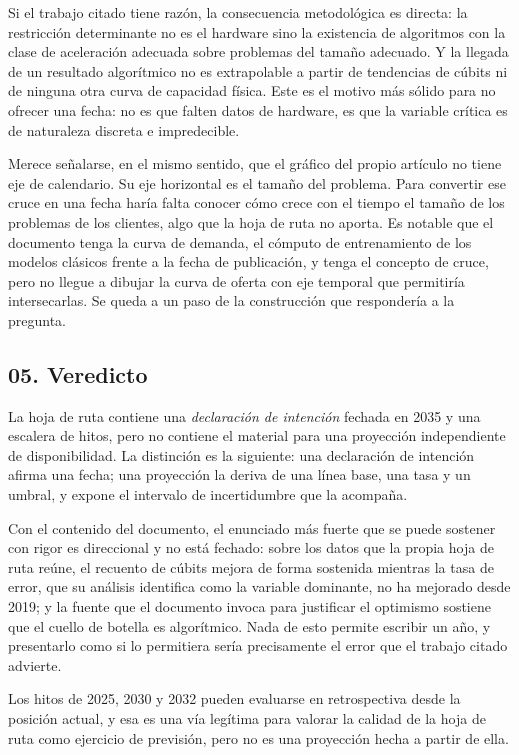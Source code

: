 \documentclass[11pt,letterpaper]{article}
\begin{document}
Si el trabajo citado tiene razón, la consecuencia metodológica es directa: la
restricción determinante no es el hardware sino la existencia de algoritmos con
la clase de aceleración adecuada sobre problemas del tamaño adecuado. Y la
llegada de un resultado algorítmico no es extrapolable a partir de tendencias
de cúbits ni de ninguna otra curva de capacidad física. Este es el motivo más
sólido para no ofrecer una fecha: no es que falten datos de hardware, es que
la variable crítica es de naturaleza discreta e impredecible.

Merece señalarse, en el mismo sentido, que el gráfico del propio artículo no
tiene eje de calendario. Su eje horizontal es el tamaño del problema. Para
convertir ese cruce en una fecha haría falta conocer cómo crece con el tiempo
el tamaño de los problemas de los clientes, algo que la hoja de ruta no aporta.
Es notable que el documento tenga la curva de demanda, el cómputo de
entrenamiento de los modelos clásicos frente a la fecha de publicación, y tenga
el concepto de cruce, pero no llegue a dibujar la curva de oferta con eje
temporal que permitiría intersecarlas. Se queda a un paso de la construcción
que respondería a la pregunta.

\subsection*{05. Veredicto}

La hoja de ruta contiene una \emph{declaración de intención} fechada en 2035 y
una escalera de hitos, pero no contiene el material para una proyección
independiente de disponibilidad. La distinción es la siguiente: una declaración
de intención afirma una fecha; una proyección la deriva de una línea base, una
tasa y un umbral, y expone el intervalo de incertidumbre que la acompaña.

Con el contenido del documento, el enunciado más fuerte que se puede sostener
con rigor es direccional y no está fechado: sobre los datos que la propia hoja
de ruta reúne, el recuento de cúbits mejora de forma sostenida mientras la
tasa de error, que su análisis identifica como la variable dominante, no ha
mejorado desde 2019; y la fuente que el documento invoca para justificar el
optimismo sostiene que el cuello de botella es algorítmico. Nada de esto
permite escribir un año, y presentarlo como si lo permitiera sería precisamente
el error que el trabajo citado advierte.

Los hitos de 2025, 2030 y 2032 pueden evaluarse en retrospectiva desde la
posición actual, y esa es una vía legítima para valorar la calidad de la hoja
de ruta como ejercicio de previsión, pero no es una proyección hecha a partir
de ella.
\end{document}
